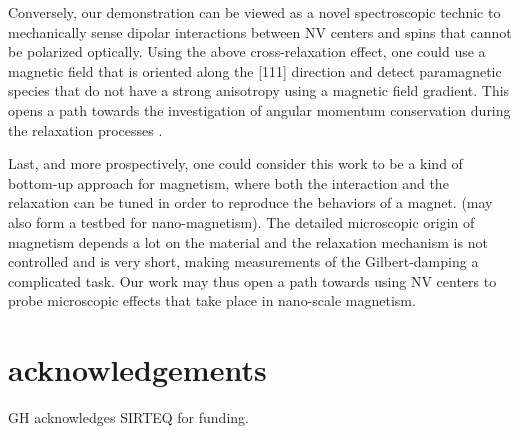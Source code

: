 \documentclass[preprintnumbers,amsmath,amssymb,superscriptaddress,twocolumn,showpacs]{revtex4-1}
\begin{document}
Conversely, our demonstration can be viewed as a novel spectroscopic technic to mechanically sense dipolar interactions between NV centers and spins that cannot be polarized optically.  Using the above cross-relaxation effect, one could use a magnetic field that is oriented along the [111] direction and detect paramagnetic species that do not have 
a strong anisotropy using a magnetic field gradient.  This opens a path towards the investigation of angular momentum conservation during the relaxation processes \cite{Zangara}.

Last, and more prospectively, one could consider this work to be a kind of bottom-up approach for magnetism, where both the interaction and the relaxation can be tuned in order to reproduce the behaviors of a magnet. (may also form a testbed for nano-magnetism).
The detailed microscopic origin of magnetism depends a lot on the material and the relaxation mechanism is not controlled and is very short, making measurements of the  Gilbert-damping a complicated task.
Our work may thus open a path towards using NV centers to probe microscopic effects that take place in nano-scale magnetism. 


\section*{acknowledgements}
GH acknowledges SIRTEQ for funding.


\end{document}
